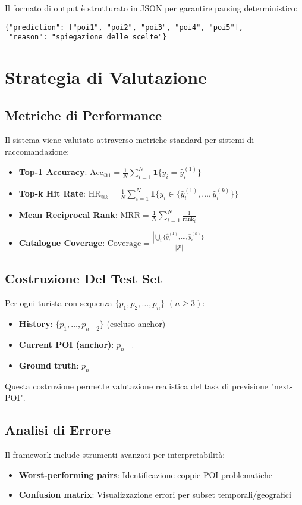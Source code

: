Il formato di output è strutturato in JSON per garantire parsing deterministico:
\begin{verbatim}
{"prediction": ["poi1", "poi2", "poi3", "poi4", "poi5"], 
 "reason": "spiegazione delle scelte"}
\end{verbatim}

\section{Strategia di Valutazione}

\subsection{Metriche di Performance}

Il sistema viene valutato attraverso metriche standard per sistemi di raccomandazione:

\begin{itemize}
\item \textbf{Top-1 Accuracy}: $\text{Acc}_{@1}=\frac{1}{N}\sum_{i=1}^{N}\mathbf{1}\{y_i=\hat{y}_i^{(1)}\}$
\item \textbf{Top-k Hit Rate}: $\text{HR}_{@k}=\frac{1}{N}\sum_{i=1}^{N}\mathbf{1}\{y_i\in\{\hat{y}_i^{(1)},\dots,\hat{y}_i^{(k)}\}\}$
\item \textbf{Mean Reciprocal Rank}: $\text{MRR}=\frac{1}{N}\sum_{i=1}^{N}\frac{1}{\operatorname{rank}_i}$
\item \textbf{Catalogue Coverage}: $\text{Coverage}=\frac{|\bigcup_{i}\{\hat{y}_i^{(1)},\dots,\hat{y}_i^{(k)}\}|}{|\mathcal{P}|}$
\end{itemize}

\subsection{Costruzione Del Test Set}

Per ogni turista con sequenza $\{p_1, p_2, \dots, p_n\}$ $(n \ge 3)$:
\begin{itemize}
\item \textbf{History}: $\{p_1, \dots, p_{n-2}\}$ (escluso anchor)
\item \textbf{Current POI (anchor)}: $p_{n-1}$ 
\item \textbf{Ground truth}: $p_n$
\end{itemize}

Questa costruzione permette valutazione realistica del task di previsione "next-POI".

\subsection{Analisi di Errore}

Il framework include strumenti avanzati per interpretabilità:
\begin{itemize}
\item \textbf{Worst-performing pairs}: Identificazione coppie POI problematiche
\item \textbf{Confusion matrix}: Visualizzazione errori per subset temporali/geografici  
\end{itemize}
